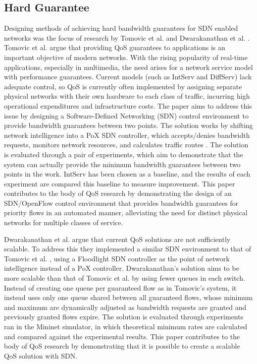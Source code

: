 \documentclass[accepted,single]{gipaper}
\begin{document}
\subsection{Hard Guarantee}
\label{hard_qos}

Designing methods of achieving hard bandwidth guarantees for SDN enabled networks was the focus of research by Tomovic et al. \cite{Tomovic:2014} and Dwarakanathan et al. \cite{Dwara:2015}.
\\


Tomovic et al. \cite{Tomovic:2014} argue that providing QoS guarantees to applications is an important objective of modern networks. With the rising popularity of real-time applications, especially in multimedia, the need arises for a network service model with performance guarantees. Current models (such as IntServ and DiffServ) lack adequate control, so QoS is currently often implemented by assigning separate physical networks with their own hardware to each class of traffic, incurring high operational expenditures and infrastructure costs. The paper aims to address this issue by designing a Software-Defined Networking (SDN) control environment to provide bandwidth guarantees between two points. The solution works by shifting network intelligence into a PoX SDN controller, which accepts/denies bandwidth requests, monitors network resources, and calculates traffic routes \cite{Tomovic:2014}. The solution is evaluated through a pair of experiments, which aim to demonstrate that the system can actually provide the minimum bandwidth guarantees between two points in the work. IntServ has been chosen as a baseline, and the results of each experiment are compared this baseline to measure improvement. This paper contributes to the body of QoS research by demonstrating the design of an SDN/OpenFlow control environment that provides bandwidth guarantees for priority flows in an automated manner, alleviating the need for distinct physical networks for multiple classes of service.


Dwarakanathan et al. \cite{Dwara:2015} argue that current QoS solutions are not sufficiently scalable. To address this they implemented a similar SDN environment to that of Tomovic et al. \cite{Tomovic:2014}, using a Floodlight SDN controller as the point of network intelligence instead of a PoX controller. Dwarakanathan's \cite{Dwara:2015} solution aims to be more scalable than that of Tomovic et al. \cite{Tomovic:2014} by using fewer queues in each switch. Instead of creating one queue per guaranteed flow as in Tomovic's \cite{Tomovic:2014} system, it instead uses only one queue shared between all guaranteed flows, whose minimum and maximum are dynamically adjusted as bandwidth requests are granted and previously granted flows expire. The solution is evaluated through experiments ran in the Mininet simulator, in which theoretical minimum rates are calculated and compared against the experimental results. This paper contributes to the body of QoS research by demonstrating that it is possible to create a scalable QoS solution with SDN.
\end{document}
